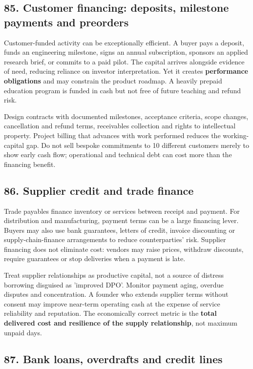 \subsection{85. Customer financing: deposits, milestone payments and preorders}


Customer-funded activity can be exceptionally efficient. A buyer pays a deposit, funds an engineering milestone, signs an annual subscription, sponsors an applied research brief, or commits to a paid pilot. The capital arrives alongside evidence of need, reducing reliance on investor interpretation. Yet it creates \textbf{performance obligations} and may constrain the product roadmap. A heavily prepaid education program is funded in cash but not free of future teaching and refund risk.

Design contracts with documented milestones, acceptance criteria, scope changes, cancellation and refund terms, receivables collection and rights to intellectual property. Project billing that advances with work performed reduces the working-capital gap. Do not sell bespoke commitments to 10 different customers merely to show early cash flow; operational and technical debt can cost more than the financing benefit.

\subsection{86. Supplier credit and trade finance}


Trade payables finance inventory or services between receipt and payment. For distribution and manufacturing, payment terms can be a large financing lever. Buyers may also use bank guarantees, letters of credit, invoice discounting or supply-chain-finance arrangements to reduce counterparties' risk. Supplier financing does not eliminate cost: vendors may raise prices, withdraw discounts, require guarantees or stop deliveries when a payment is late.

Treat supplier relationships as productive capital, not a source of distress borrowing disguised as 'improved DPO'. Monitor payment aging, overdue disputes and concentration. A founder who extends supplier terms without consent may improve near-term operating cash at the expense of service reliability and reputation. The economically correct metric is the \textbf{total delivered cost and resilience of the supply relationship}, not maximum unpaid days.

\subsection{87. Bank loans, overdrafts and credit lines}


